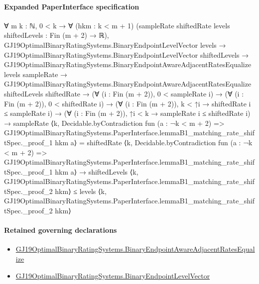 \documentclass[10pt]{article}
\begin{document}
\paragraph{Expanded PaperInterface specification}
\begin{ReviewVerbatim}
∀ {m k : ℕ},
  0 < k →
    ∀ (hkm : k < m + 1) (sampleRate shiftedRate levels shiftedLevels : Fin (m + 2) → ℝ),
      GJ19OptimalBinaryRatingSystems.BinaryEndpointLevelVector levels →
        GJ19OptimalBinaryRatingSystems.BinaryEndpointLevelVector shiftedLevels →
          GJ19OptimalBinaryRatingSystems.BinaryEndpointAwareAdjacentRatesEqualize levels sampleRate →
            GJ19OptimalBinaryRatingSystems.BinaryEndpointAwareAdjacentRatesEqualize shiftedLevels shiftedRate →
              (∀ (i : Fin (m + 2)), 0 < sampleRate i) →
                (∀ (i : Fin (m + 2)), 0 < shiftedRate i) →
                  (∀ (i : Fin (m + 2)), k < ↑i → shiftedRate i ≤ sampleRate i) →
                    (∀ (i : Fin (m + 2)), ↑i < k → sampleRate i ≤ shiftedRate i) →
                      sampleRate
                            ⟨k,
                              Decidable.byContradiction fun (a : ¬k < m + 2) =>
                                GJ19OptimalBinaryRatingSystems.PaperInterface.lemmaB1_matching_rate_shiftSpec._proof_1
                                  hkm a⟩ =
                          shiftedRate
                            ⟨k,
                              Decidable.byContradiction fun (a : ¬k < m + 2) =>
                                GJ19OptimalBinaryRatingSystems.PaperInterface.lemmaB1_matching_rate_shiftSpec._proof_1
                                  hkm a⟩ →
                        shiftedLevels
                            ⟨k,
                              GJ19OptimalBinaryRatingSystems.PaperInterface.lemmaB1_matching_rate_shiftSpec._proof_2
                                hkm⟩ ≤
                          levels
                            ⟨k,
                              GJ19OptimalBinaryRatingSystems.PaperInterface.lemmaB1_matching_rate_shiftSpec._proof_2
                                hkm⟩
\end{ReviewVerbatim}

\paragraph{Retained governing declarations}
\begin{itemize}\raggedright
\item \hyperlink{governing-declaration-5a62c276eedad684}{GJ19\allowbreak{}Optimal\allowbreak{}Binary\allowbreak{}Rating\allowbreak{}Systems.\allowbreak{}Binary\allowbreak{}Endpoint\allowbreak{}Aware\allowbreak{}Adjacent\allowbreak{}Rates\allowbreak{}Equalize}
\item \hyperlink{governing-declaration-aa797f827cdcda67}{GJ19\allowbreak{}Optimal\allowbreak{}Binary\allowbreak{}Rating\allowbreak{}Systems.\allowbreak{}Binary\allowbreak{}Endpoint\allowbreak{}Level\allowbreak{}Vector}
\end{itemize}
\end{document}
